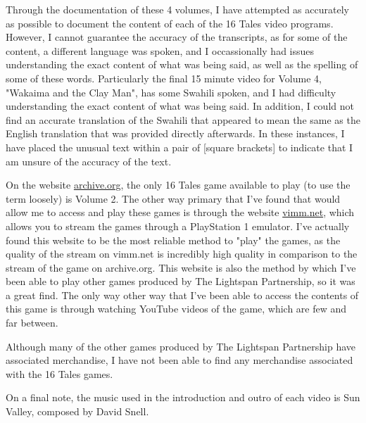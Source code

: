 Through the documentation of these 4 volumes, I have attempted as accurately as possible to document the content of each of the 16 Tales video programs.
However, I cannot guarantee the accuracy of the transcripts, as for some of the content, a different language was spoken, and I occassionally had issues understanding the exact content of what was being said, as well as the spelling of some of these words.
Particularly the final 15 minute video for Volume 4, "Wakaima and the Clay Man", has some Swahili spoken, and I had difficulty understanding the exact content of what was being said.
In addition, I could not find an accurate translation of the Swahili that appeared to mean the same as the English translation that was provided directly afterwards.
In these instances, I have placed the unusual text within a pair of [square brackets] to indicate that I am unsure of the accuracy of the text.

On the website \href{https://archive.org}{archive.org}, the only 16 Tales game available to play (to use the term loosely) is Volume 2.
The other way primary that I've found that would allow me to access and play these games is through the website \href{https://vimm.net}{vimm.net}, which allows you to stream the games through a PlayStation 1 emulator.
I've actually found this website to be the most reliable method to "play" the games, as the quality of the stream on vimm.net is incredibly high quality in comparison to the stream of the game on archive.org.
This website is also the method by which I've been able to play other games produced by The Lightspan Partnership, so it was a great find.
The only way other way that I've been able to access the contents of this game is through watching YouTube videos of the game, which are few and far between.

Although many of the other games produced by The Lightspan Partnership have associated merchandise, I have not been able to find any merchandise associated with the 16 Tales games.

On a final note, the music used in the introduction and outro of each video is Sun Valley, composed by David Snell.